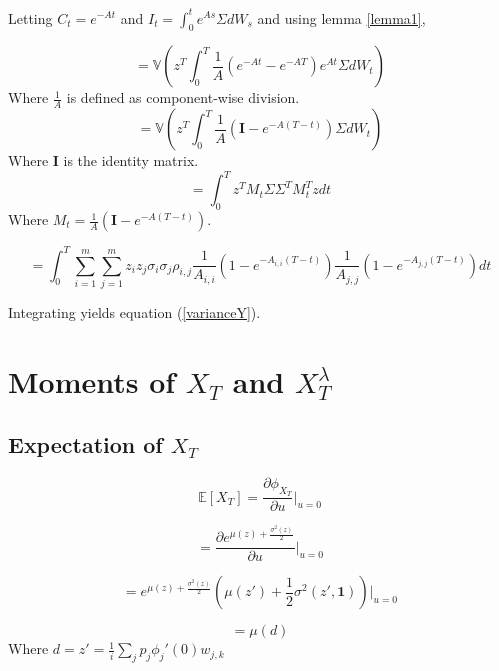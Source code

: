 \documentclass[12pt]{article}
\theoremstyle{definition}
\begin{document}
Letting \(C_t=e^{-At}\) and \(I_t=\int_ 0 ^ t e^{As} \Sigma dW_s \) and using lemma \ref{lemma1},

\begin{equation}
=\mathbb{V}\left(z^T  \int_ 0 ^ T \frac{1}{A}\left( e^{-At} -e^{-AT} \right) e^{At}\Sigma dW_t  \right)
\end{equation}
Where \(\frac{1}{A}\) is defined as component-wise division.
\begin{equation}
=\mathbb{V}\left(z^T  \int_ 0 ^ T \frac{1}{A}\left( \mathbf{I}-e^{-A(T-t)} \right)\Sigma dW_t  \right)
\end{equation}
Where  \(\mathbf{I}\) is the identity matrix.
\begin{equation}
=\int_ 0 ^ T z^T M_t \Sigma \Sigma ^T M_t^T z dt  
\end{equation}
Where \(M_t=\frac{1}{A}\left( \mathbf{I}-e^{-A(T-t)} \right)\).

\begin{equation}
=\int_0 ^ T \sum_{i=1} ^ m \sum_{j=1} ^ m z_i z_j \sigma_i \sigma_j \rho_{i,j} \frac{1}{A_{i,i}}\left(1-e^{-{A}_{i, i}(T-t)}\right)\frac{1}{A_{j,j}}\left(1-e^{-{A}_{j, j}(T-t)}\right) dt\end{equation}

Integrating yields equation (\ref{varianceY}).
\section{Moments of \(X_T\) and \(X_T ^ \lambda\)} \label{mX}

\subsection{Expectation of \(X_T\)}

\begin{equation}
\mathbb{E}[X_T]=\frac{\partial \phi_{X_T}}{\partial u} \big|_{u=0}
\end{equation}

\begin{equation}
 =\frac{\partial e^{\mu(z)+\frac{\sigma^2(z)}{2} }}{\partial u} \bigg|_{u=0}\end{equation}
 
 \begin{equation}
 = e^{\mu(z)+\frac{\sigma^2(z)}{2} } \left(\mu(z')+\frac{1}{2} \sigma^2 (z', \mathbf{1})\right) \bigg|_{u=0}\end{equation}
 
 \begin{equation}
 =\mu(d)
 \end{equation}
 Where \(d=z'=\frac{1}{i}\sum_j p_j \phi_j'(0) w_{j, k} \)
 
\end{document}
